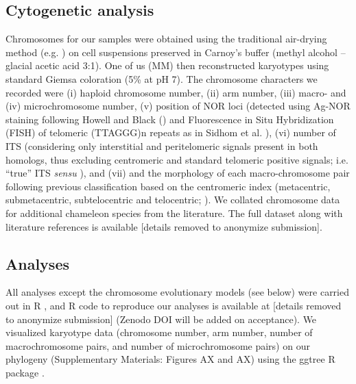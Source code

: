 \documentclass[a4paper, 12pt]{article}
\begin{document}
\subsection{Cytogenetic analysis}
Chromosomes for our samples were obtained using the traditional air-drying method (e.g. \citealt{sidhom2020karyological}) on cell suspensions preserved in Carnoy’s buffer (methyl alcohol – glacial acetic acid 3:1). 
One of us (MM) then reconstructed karyotypes using standard Giemsa coloration (5\% at pH 7). 
The chromosome characters we recorded were (i) haploid chromosome number, (ii) arm number, (iii) macro- and (iv) microchromosome number, (v) position of NOR loci (detected using Ag-NOR staining following Howell and Black (\citeyear{howell1980controlled}) and Fluorescence in Situ Hybridization (FISH) of telomeric (TTAGGG)n repeats as in Sidhom et al. \citeyear{sidhom2020karyological}), (vi) number of ITS (considering only interstitial and peritelomeric signals present in both homologs, thus excluding centromeric and standard telomeric positive signals; i.e. “true” ITS \textit{sensu} \citealt{bolzan2012chromosomal,chirino2017chromosomal}), and (vii) and the morphology of each macro-chromosome pair following previous classification based on the centromeric index (metacentric, submetacentric, subtelocentric and telocentric; \citealt{levan1964nomenclature}). 
We collated chromosome data for additional chameleon species from the literature. 
The full dataset along with literature references is available [details removed to anonymize submission].

\subsection{Analyses}
All analyses except the chromosome evolutionary models (see below) were carried out in R \citep{R}, and R code to reproduce our analyses is available at [details removed to anonymize submission] (Zenodo DOI will be added on acceptance). 
We visualized karyotype data (chromosome number, arm number, number of macrochromosome pairs, and number of microchromosome pairs) on our phylogeny (Supplementary Materials: Figures AX and AX) using the ggtree R package \citep{yu2017ggtree}.
\end{document}
